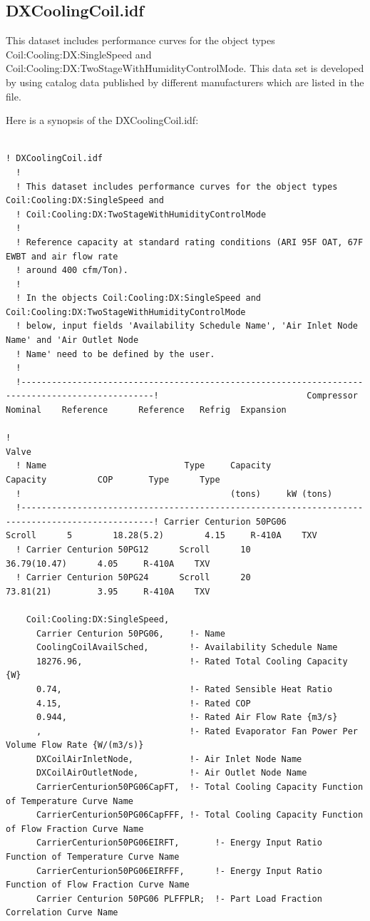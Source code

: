 \subsection{DXCoolingCoil.idf}\label{dxcoolingcoil.idf}

This dataset includes performance curves for the object types Coil:Cooling:DX:SingleSpeed and Coil:Cooling:DX:TwoStageWithHumidityControlMode. This data set is developed by using catalog data published by different manufacturers which are listed in the file.

Here is a synopsis of the DXCoolingCoil.idf:

\begin{lstlisting}

! DXCoolingCoil.idf
  !
  ! This dataset includes performance curves for the object types Coil:Cooling:DX:SingleSpeed and
  ! Coil:Cooling:DX:TwoStageWithHumidityControlMode
  !
  ! Reference capacity at standard rating conditions (ARI 95F OAT, 67F EWBT and air flow rate
  ! around 400 cfm/Ton).
  !
  ! In the objects Coil:Cooling:DX:SingleSpeed and Coil:Cooling:DX:TwoStageWithHumidityControlMode
  ! below, input fields 'Availability Schedule Name', 'Air Inlet Node Name' and 'Air Outlet Node
  ! Name' need to be defined by the user.
  !
  !------------------------------------------------------------------------------------------------!                             Compressor  Nominal    Reference      Reference   Refrig  Expansion
  !                                                                                         Valve
  ! Name                           Type     Capacity   Capacity          COP       Type      Type
  !                                         (tons)     kW (tons)
  !------------------------------------------------------------------------------------------------! Carrier Centurion 50PG06      Scroll      5        18.28(5.2)        4.15     R-410A    TXV
  ! Carrier Centurion 50PG12      Scroll      10       36.79(10.47)      4.05     R-410A    TXV
  ! Carrier Centurion 50PG24      Scroll      20       73.81(21)         3.95     R-410A    TXV

    Coil:Cooling:DX:SingleSpeed,
      Carrier Centurion 50PG06,     !- Name
      CoolingCoilAvailSched,        !- Availability Schedule Name
      18276.96,                     !- Rated Total Cooling Capacity {W}
      0.74,                         !- Rated Sensible Heat Ratio
      4.15,                         !- Rated COP
      0.944,                        !- Rated Air Flow Rate {m3/s}
      ,                             !- Rated Evaporator Fan Power Per Volume Flow Rate {W/(m3/s)}
      DXCoilAirInletNode,           !- Air Inlet Node Name
      DXCoilAirOutletNode,          !- Air Outlet Node Name
      CarrierCenturion50PG06CapFT,  !- Total Cooling Capacity Function of Temperature Curve Name
      CarrierCenturion50PG06CapFFF, !- Total Cooling Capacity Function of Flow Fraction Curve Name
      CarrierCenturion50PG06EIRFT,       !- Energy Input Ratio Function of Temperature Curve Name
      CarrierCenturion50PG06EIRFFF,      !- Energy Input Ratio Function of Flow Fraction Curve Name
      Carrier Centurion 50PG06 PLFFPLR;  !- Part Load Fraction Correlation Curve Name


\end{lstlisting}
